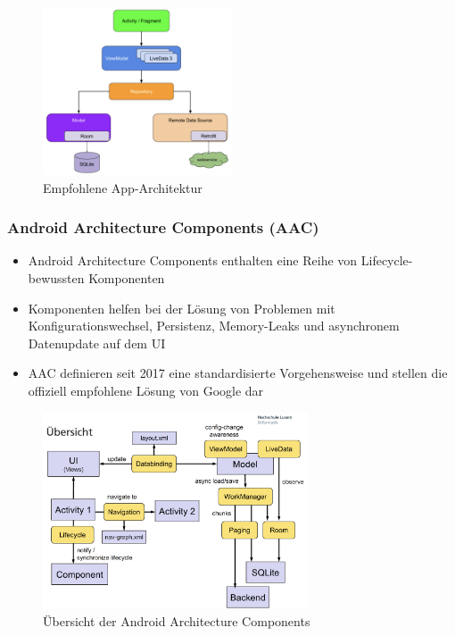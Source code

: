 \documentclass[a4paper]{article}
\begin{document}
		\begin{figure}[htb!]
			\centering
			\includegraphics[width=0.5\textwidth]{img/techintro/apparch.png}
			\caption{Empfohlene App-Architektur}
			\label{fig:techintro_apparch}
		\end{figure}
		
		\newpage
		
			\subsubsection{Android Architecture Components (AAC)}
			
			\begin{itemize}
				\item Android Architecture Components enthalten eine Reihe von Lifecycle-bewussten Komponenten
				\item Komponenten helfen bei der Lösung von Problemen mit Konfigurationswechsel, Persistenz, Memory-Leaks und asynchronem Datenupdate auf dem UI
				\item AAC definieren seit 2017 eine standardisierte Vorgehensweise und stellen die offiziell empfohlene Lösung von Google dar
			\end{itemize}
		
			\begin{figure}[htb!]
				\centering
				\includegraphics[width=0.7\textwidth]{img/techintro/overview_aac.png}
				\caption{Übersicht der Android Architecture Components}
				\label{fig:techintro_overview_aac}
			\end{figure}
		
\end{document}

